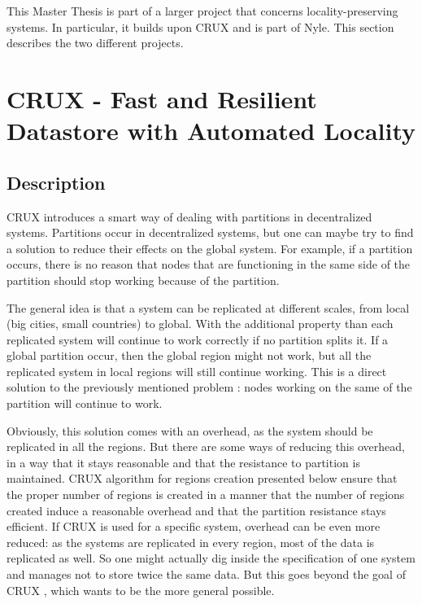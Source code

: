 \documentclass[a4paper,11pt,oneside]{report}
\begin{document}

This Master Thesis is part of a larger project that concerns
locality-preserving systems. In particular, it builds upon
CRUX \cite{Basescu2014} and is part of Nyle. This section describes the two
different projects. 

\section{CRUX - Fast and Resilient Datastore with Automated Locality}

\subsection{Description}
CRUX \cite{Basescu2014} introduces a smart way of dealing with partitions in
decentralized systems. Partitions occur in
decentralized systems, but one can maybe try to find a solution to reduce their
effects on the global system. For example, if a partition occurs, there is no
reason that nodes that are functioning in the same side of the partition should
stop working because of the partition. 

The general idea is that a system can be replicated at different scales, from
local (big cities, small countries) to global.  With the additional property than each
replicated system will continue to work correctly if no partition splits it. If
a global partition occur, then the global region might not work, but all the
replicated system in local regions will still continue working. This is a
direct solution to the previously mentioned problem : nodes working on the same
of the partition will continue to work.

Obviously, this solution comes with an overhead, as the system should be
replicated in all the regions. But there are some ways of reducing this
overhead, in a way that it stays reasonable and that the resistance to
partition is maintained. CRUX algorithm for regions
creation \cite{Basescu2014} presented below ensure that the proper number of
regions is created in a manner that the number of regions created induce a
reasonable overhead and that the partition resistance stays efficient. If CRUX
\cite{Basescu2014} is used for a specific system, overhead can be even more
reduced:  as the systems are replicated in every region, most of the data is
replicated as well. So one might actually dig inside the specification of one
system and manages not to store twice the same data. But this goes beyond
the goal of CRUX \cite{Basescu2014}, which wants to be the more general
possible. 
\end{document}

